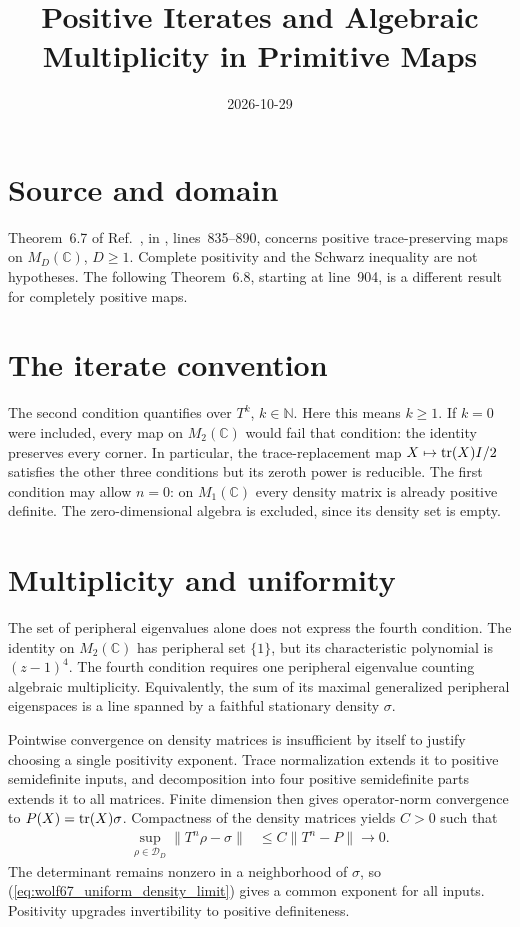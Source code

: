 \documentclass[11pt]{article}
\title{Positive Iterates and Algebraic Multiplicity in Primitive Maps}
\author{}
\date{2026-10-29}
\begin{document}
\maketitle
{}

\section{Source and domain}

Theorem~6.7 of Ref.~\cite{Wolf2012Quantum}, in
, lines~835--890,
concerns positive trace-preserving maps on $M_D(\mathbb C)$, $D\geq1$.
Complete positivity and the Schwarz inequality are not hypotheses. The
following Theorem~6.8, starting at line~904, is a different result for
completely positive maps.

\section{The iterate convention}

The second condition quantifies over $T^k$, $k\in\mathbb N$. Here this means
$k\geq1$. If $k=0$ were included, every map on $M_2(\mathbb C)$ would fail
that condition: the identity preserves every corner. In particular, the
trace-replacement map $X\mapsto\operatorname{tr}(X)I/2$ satisfies the other three
conditions but its zeroth power is reducible. The first condition may allow
$n=0$: on $M_1(\mathbb C)$ every density matrix is already positive definite.
The zero-dimensional algebra is excluded, since its density set is empty.

\section{Multiplicity and uniformity}

The set of peripheral eigenvalues alone does not express the fourth
condition. The identity on $M_2(\mathbb C)$ has peripheral set $\{1\}$,
but its characteristic polynomial is $(z-1)^4$. The fourth condition requires
one peripheral eigenvalue counting algebraic multiplicity. Equivalently,
the sum of its maximal generalized peripheral eigenspaces is a line spanned
by a faithful stationary density $\sigma$.

Pointwise convergence on density matrices is insufficient by itself to
justify choosing a single positivity exponent. Trace normalization extends
it to positive semidefinite inputs, and decomposition into four positive
semidefinite parts extends it to all matrices. Finite dimension then gives
operator-norm convergence to $P(X)=\operatorname{tr}(X)\sigma$. Compactness of the density
matrices yields $C>0$ such that
\begin{align}
    \sup_{\rho\in\mathcal D_D}\|T^n\rho-\sigma\|
        &\leq C\|T^n-P\|\longrightarrow0.
    \label{eq:wolf67_uniform_density_limit}
\end{align}
The determinant remains nonzero in a neighborhood of $\sigma$, so
(\ref{eq:wolf67_uniform_density_limit}) gives a common exponent for all
inputs. Positivity upgrades invertibility to positive definiteness.
\end{document}
